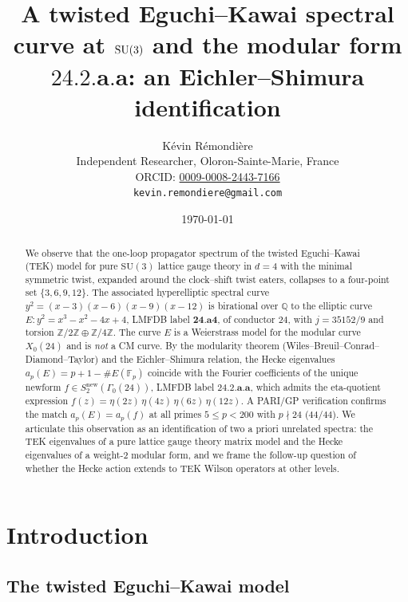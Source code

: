 \documentclass[11pt]{amsart}
\title[A TEK spectral curve and the modular form 24.2.a.a]{%
  A twisted Eguchi--Kawai spectral curve at \(\SU(3)\) and the
  modular form \(\mathbf{24.2.a.a}\): an Eichler--Shimura identification}
\author[K. R\'emondi\`ere]{K\'evin R\'emondi\`ere\\
\small Independent Researcher, Oloron-Sainte-Marie, France\\
\small ORCID: \href{https://orcid.org/0009-0008-2443-7166}{0009-0008-2443-7166}\\
\small \texttt{kevin.remondiere@gmail.com}}
\date{\today}
\theoremstyle{definition}
\theoremstyle{remark}
\newcommand{\Q}{\mathbb{Q}}
\newcommand{\Z}{\mathbb{Z}}
\newcommand{\F}{\mathbb{F}}
\newcommand{\SU}{\mathrm{SU}}
\begin{document}
\begin{abstract}
We observe that the one-loop propagator spectrum of the twisted
Eguchi--Kawai (TEK) model for pure \(\SU(3)\) lattice gauge theory in
\(d=4\) with the minimal symmetric twist, expanded around the
clock--shift twist eaters, collapses to a four-point set
\(\{3,6,9,12\}\). The associated hyperelliptic spectral curve
\(y^{2} = (x-3)(x-6)(x-9)(x-12)\) is birational over \(\Q\) to the
elliptic curve
\(E\colon y^{2} = x^{3} - x^{2} - 4x + 4\), LMFDB label
\(\mathbf{24.a4}\), of conductor \(24\), with \(j = 35152/9\) and
torsion \(\Z/2\Z \oplus \Z/4\Z\). The curve \(E\) is a Weierstrass
model for the modular curve \(X_{0}(24)\) and is \emph{not} a CM curve.
By the modularity theorem (Wiles--Breuil--Conrad--Diamond--Taylor) and
the Eichler--Shimura relation, the Hecke eigenvalues
\(a_{p}(E) = p + 1 - \#E(\F_p)\) coincide with the Fourier coefficients
of the unique newform \(f \in S_{2}^{\mathrm{new}}(\Gamma_{0}(24))\),
LMFDB label \(\mathbf{24.2.a.a}\), which admits the eta-quotient
expression
\(f(z) = \eta(2z)\,\eta(4z)\,\eta(6z)\,\eta(12z)\).
A PARI/GP verification confirms the match
\(a_{p}(E) = a_{p}(f)\) at all primes \(5 \le p < 200\) with
\(p \nmid 24\) (\(44/44\)). We articulate this observation as an
identification of two a priori unrelated spectra: the TEK eigenvalues
of a pure lattice gauge theory matrix model and the Hecke eigenvalues
of a weight-\(2\) modular form, and we frame the
follow-up question of whether the Hecke action extends to TEK Wilson
operators at other levels.
\end{abstract}

\maketitle

\section{Introduction}\label{sec:intro}

\subsection*{The twisted Eguchi--Kawai model}
\end{document}
